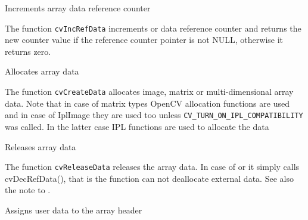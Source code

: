

Increments array data reference counter


\begin{description}
\end{description}


The function \texttt{cvIncRefData} increments  or
 data reference counter and returns the new counter value
if the reference counter pointer is not NULL, otherwise it returns zero.


Allocates array data


\begin{description}
\end{description}


The function \texttt{cvCreateData} allocates image, matrix or
multi-dimensional array data. Note that in case of matrix types OpenCV
allocation functions are used and in case of IplImage they are used
too unless \texttt{CV\_TURN\_ON\_IPL\_COMPATIBILITY} was called. In the
latter case IPL functions are used to allocate the data


Releases array data


\begin{description}
\end{description}


The function \texttt{cvReleaseData} releases the array data. In case of  or  it simply calls cvDecRefData(), that is the function can not deallocate external data. See also the note to .


Assigns user data to the array header

